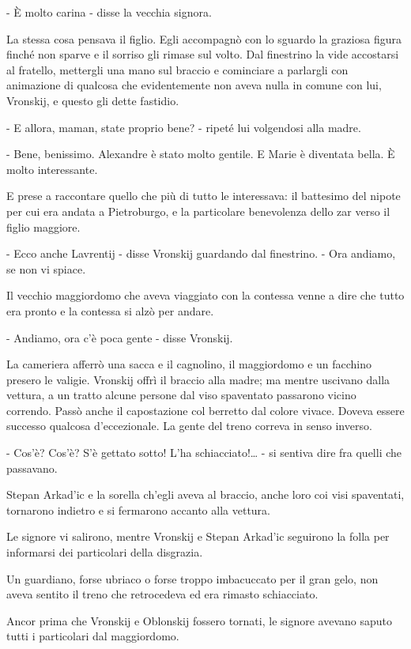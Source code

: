 - È molto carina - disse la vecchia signora. 

La stessa cosa pensava il figlio. Egli accompagnò con lo sguardo la graziosa figura finché non sparve e il sorriso gli rimase sul volto. Dal finestrino la vide accostarsi al fratello, mettergli una mano sul braccio e cominciare a parlargli con animazione di qualcosa che evidentemente non aveva nulla in comune con lui, Vronskij, e questo gli dette fastidio. 

- E allora, maman, state proprio bene? - ripeté lui volgendosi alla madre. 

- Bene, benissimo. Alexandre è stato molto gentile. E Marie è diventata bella. È molto interessante. 

E prese a raccontare quello che più di tutto le interessava: il battesimo del nipote per cui era andata a Pietroburgo, e la particolare benevolenza dello zar verso il figlio maggiore. 

- Ecco anche Lavrentij - disse Vronskij guardando dal finestrino. - Ora andiamo, se non vi spiace. 

Il vecchio maggiordomo che aveva viaggiato con la contessa venne a dire che tutto era pronto e la contessa si alzò per andare. 

- Andiamo, ora c'è poca gente - disse Vronskij. 

La cameriera afferrò una sacca e il cagnolino, il maggiordomo e un facchino presero le valigie. Vronskij offrì il braccio alla madre; ma mentre uscivano dalla vettura, a un tratto alcune persone dal viso spaventato passarono vicino correndo. Passò anche il capostazione col berretto dal colore vivace. Doveva essere successo qualcosa d'eccezionale. La gente del treno correva in senso inverso. 

- Cos'è? Cos'è? S'è gettato sotto! L'ha schiacciato!\ldots{} - si sentiva dire fra quelli che passavano. 

Stepan Arkad'ic e la sorella ch'egli aveva al braccio, anche loro coi visi spaventati, tornarono indietro e si fermarono accanto alla vettura. 

Le signore vi salirono, mentre Vronskij e Stepan Arkad'ic seguirono la folla per informarsi dei particolari della disgrazia. 

Un guardiano, forse ubriaco o forse troppo imbacuccato per il gran gelo, non aveva sentito il treno che retrocedeva ed era rimasto schiacciato. 

Ancor prima che Vronskij e Oblonskij fossero tornati, le signore avevano saputo tutti i particolari dal maggiordomo. 

